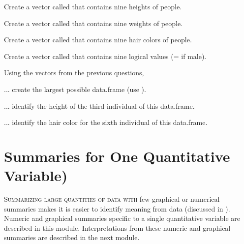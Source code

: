 \documentclass[10pt,openany]{book}\usepackage[]{graphicx}\usepackage[]{color}
\begin{document}
\begin{exsection}
  \item \label{revex:BasicsData1}\rhw{} Create a vector called  that contains nine heights of people. 
  \item \label{revex:BasicsData2}\rhw{} Create a vector called  that contains nine weights of people. 
  \item \label{revex:BasicsData3}\rhw{} Create a vector called  that contains nine hair colors of people. 
  \item \label{revex:BasicsData4}\rhw{} Create a vector called  that contains nine logical values (= if male). 
  \item \label{revex:BasicsData5}\rhw{} Using the vectors from the previous questions,  
  \begin{Enumerate}
    \item ... create the largest possible data.frame (use ).
    \item ... identify the height of the third individual of this data.frame.
    \item ... identify the hair color for the sixth individual of this data.frame.
  \end{Enumerate}
\end{exsection}



\chapter[Summary One Quant Var]{Summaries for One Quantitative Variable)} \label{chap:UnivEDAQuant1}

\vspace{-48pt}
\minitoc
\vspace{12pt}

\lettrine{S}{ummarizing large quantities of data with} few graphical or numerical summaries makes it is easier to identify meaning from data (discussed in ). Numeric and graphical summaries specific to a single quantitative variable are described in this module. Interpretations from these numeric and graphical summaries are described in the next module.
\end{document}
